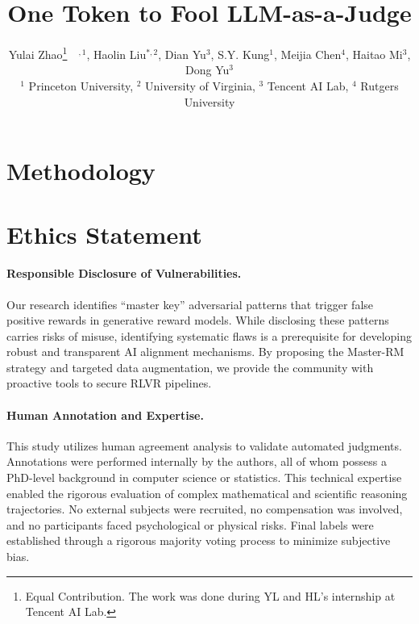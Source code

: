 \documentclass{article} %
\title{One Token to Fool LLM-as-a-Judge}
\author{Yulai Zhao\thanks{Equal Contribution. The work was done during YL and HL's internship at Tencent AI Lab.}~~$^{,1}$, Haolin Liu$^{*,2}$, Dian Yu$^{3}$, S.Y. Kung$^{1}$, Meijia Chen$^{4}$,  Haitao Mi$^{3}$, Dong Yu$^{3}$ \\
$^1$ Princeton University, $^2$ University of Virginia, $^3$ Tencent AI Lab,  $^4$ Rutgers University
}
\theoremstyle{plain}
\theoremstyle{definition}
\theoremstyle{remark}
\begin{document}
\ifcolmsubmission
\linenumbers
\fi

\maketitle

% 


% 



\section{Methodology}
\label{sec:pre}






\newpage

\section*{Ethics Statement}
\paragraph{Responsible Disclosure of Vulnerabilities.} Our research identifies ``master key'' adversarial patterns that trigger false positive rewards in generative reward models. While disclosing these patterns carries risks of misuse, identifying systematic flaws is a prerequisite for developing robust and transparent AI alignment mechanisms. By proposing the Master-RM strategy and targeted data augmentation, we provide the community with proactive tools to secure RLVR pipelines.

\paragraph{Human Annotation and Expertise.} This study utilizes human agreement analysis to validate automated judgments. Annotations were performed internally by the authors, all of whom possess a PhD-level background in computer science or statistics. This technical expertise enabled the rigorous evaluation of complex mathematical and scientific reasoning trajectories. No external subjects were recruited, no compensation was involved, and no participants faced psychological or physical risks. Final labels were established through a rigorous majority voting process to minimize subjective bias.
\end{document}
